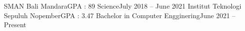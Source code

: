 \resumeSubHeadingListStart
  \resumeSubheading
    {SMAN Bali Mandara}{GPA : 89}
    {Science}{July 2018 -- June 2021} 
  \resumeSubheading
    {Institut Teknologi Sepuluh Nopember}{GPA : 3.47 }
    {Bachelor in Computer Engginering}{June 2021 -- Present}
    \vspace{6pt}
\resumeSubHeadingListEnd
